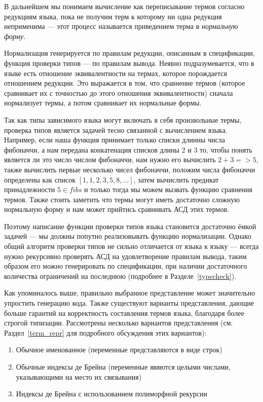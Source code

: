 В дальнейшем мы понимаем вычисление как переписывание термов согласно редукциям языка, пока не получим терм к которому ни одна редукция неприменима --- этот процесс называется приведением терма в \textit{нормальную форму}.

Нормализация генерируется по правилам редукции, описанным в спецификации, функция проверки типов --- по правилам вывода. Неявно подразумевается, что в языке есть отношение эквивалентности на термах, которое порождается отношением редукции. Это выражается в том, что сравнение термов (которое сравнивает их с точностью до этого отношения эквивалентности) сначала нормализует термы, а потом сравнивает их нормальные формы.

Так как типы зависимого языка могут включать в себя произвольные термы, проверка типов является задачей тесно связанной с вычислением языка. Например, если наша функция принимает только списки длинны числа фибоначчи, а нам передана конкатенация списков длины 2 и 3 то, чтобы понять является ли это число числом фибоначчи, нам нужно его вычислить $2 + 3 => 5$, также вычислить первые несколько чисел фибоначчи, положим числа фибоначчи определены как список $[1,1,2,3,5,8,...]$, затем вычислить предикат принадлежности $5 \in fibs$ и только тогда мы можем вызвать функцию сравнения термов. Также стоить заметить что термы могут иметь достаточно сложную нормальную форму и нам может прийтись сравнивать АСД этих термов.

Поэтому написание функции проверки типов языка становится достаточно ёмкой задачей --- мы должны попутно реализовывать функцию нормализации. Однако общий алгоритм проверки типов не сильно отличается от языка к языку --- всегда нужно рекурсивно проверять АСД на удовлетворение правилам вывода, таким образом его можно генерировать по спецификации, при наличии достаточного количества ограничений на последнюю (подробнее в Разделе~\ref{typecheck}).


Как упоминалось выше, правильно выбранное представление может значительно упростить генерацию кода. Также существуют варианты представления, дающие больше гарантий на корректность составления термов языка, благодаря более строгой типизации. Рассмотрены несколько вариантов представления (см. Раздел~\ref{term_repr} для подробного обсуждения этих вариантов):
\begin{enumerate}
\item Обычное именованное (переменные представляются в виде строк)
\item Обычные индексы де Брейна\cite{de_brujin} (переменные явяются целыми числами, указывающими на место их связывания)
\item Индексы де Брейна с использованием полиморфной рекурсии\cite{poly_rec}
\end{enumerate}

